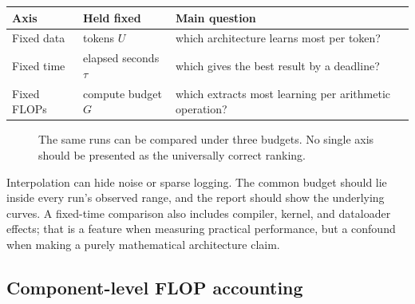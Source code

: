 \documentclass[11pt,a4paper]{article}
\theoremstyle{definition}
\theoremstyle{plain}
\begin{document}
\begin{center}
\begin{tabular}{lll}
\toprule
Axis & Held fixed & Main question\\
\midrule
Fixed data & tokens $U$ & which architecture learns most per token?\\
Fixed time & elapsed seconds $\tau$ & which gives the best result by a deadline?\\
Fixed FLOPs & compute budget $G$ & which extracts most learning per arithmetic operation?\\
\bottomrule
\end{tabular}
\end{center}

\begin{figure}[H]
\centering
{}
\caption{The same runs can be compared under three budgets. No single axis should be presented as the universally correct ranking.}
\label{fig:three-axes}
\end{figure}

Interpolation can hide noise or sparse logging. The common budget should lie inside every run's observed range, and the report should show the underlying curves. A fixed-time comparison also includes compiler, kernel, and dataloader effects; that is a feature when measuring practical performance, but a confound when making a purely mathematical architecture claim.

\subsection{Component-level FLOP accounting}
\label{sec:flop-accounting}
\end{document}
